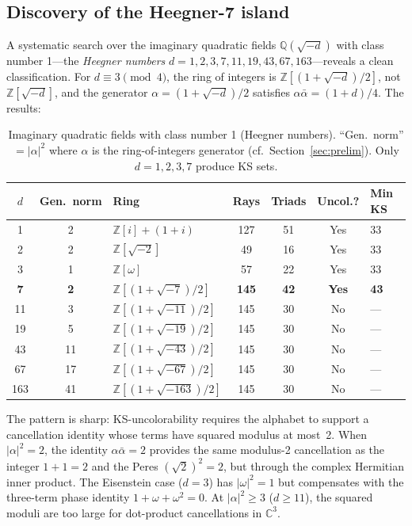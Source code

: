 \documentclass[12pt,a4paper]{article}
\newcommand{\C}{\mathbb{C}}
\newcommand{\Z}{\mathbb{Z}}
\newcommand{\Q}{\mathbb{Q}}
\begin{document}
\subsection{Discovery of the Heegner-7 island}\label{sec:heegner}

A systematic search over the imaginary quadratic fields $\Q(\sqrt{-d})$ with class number 1---the \emph{Heegner numbers} $d = 1, 2, 3, 7, 11, 19, 43, 67, 163$---reveals a clean classification. For $d \equiv 3 \pmod{4}$, the ring of integers is $\Z[(1+\sqrt{-d})/2]$, not $\Z[\sqrt{-d}]$, and the generator $\alpha = (1+\sqrt{-d})/2$ satisfies $\alpha\bar\alpha = (1+d)/4$. The results:

\begin{table}[ht]
\centering
\caption{Imaginary quadratic fields with class number 1 (Heegner numbers). ``Gen.\ norm'' $= |\alpha|^2$ where $\alpha$ is the ring-of-integers generator (cf.\ Section~\ref{sec:prelim}). Only $d = 1, 2, 3, 7$ produce KS sets.}
\label{tab:heegner}
\begin{tabular}{cclcccl}
\toprule
$d$ & Gen.\ norm & Ring & Rays & Triads & Uncol.? & Min KS \\
\midrule
1 & 2 & $\Z[i]+(1+i)$ & 127 & 51 & Yes & 33 \\
2 & 2 & $\Z[\sqrt{-2}]$ & 49 & 16 & Yes & 33 \\
3 & 1 & $\Z[\omega]$ & 57 & 22 & Yes & 33 \\
\textbf{7} & \textbf{2} & $\Z[(1+\sqrt{-7})/2]$ & \textbf{145} & \textbf{42} & \textbf{Yes} & \textbf{43} \\
11 & 3 & $\Z[(1+\sqrt{-11})/2]$ & 145 & 30 & No & --- \\
19 & 5 & $\Z[(1+\sqrt{-19})/2]$ & 145 & 30 & No & --- \\
43 & 11 & $\Z[(1+\sqrt{-43})/2]$ & 145 & 30 & No & --- \\
67 & 17 & $\Z[(1+\sqrt{-67})/2]$ & 145 & 30 & No & --- \\
163 & 41 & $\Z[(1+\sqrt{-163})/2]$ & 145 & 30 & No & --- \\
\bottomrule
\end{tabular}
\end{table}

The pattern is sharp: KS-uncolorability requires the alphabet to support a cancellation identity whose terms have squared modulus at most~2. When $|\alpha|^2 = 2$, the identity $\alpha\bar\alpha = 2$ provides the same modulus-2 cancellation as the integer $1+1=2$ and the Peres $(\sqrt{2})^2 = 2$, but through the complex Hermitian inner product. The Eisenstein case ($d = 3$) has $|\omega|^2 = 1$ but compensates with the three-term phase identity $1 + \omega + \omega^2 = 0$. At $|\alpha|^2 \geq 3$ ($d \geq 11$), the squared moduli are too large for dot-product cancellations in $\C^3$.
\end{document}
